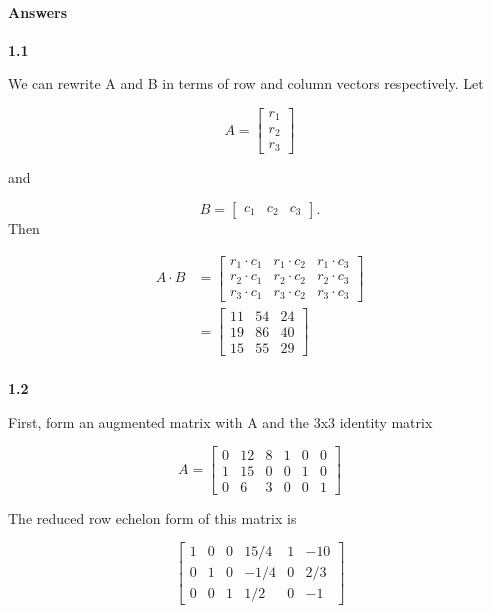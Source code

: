 \documentclass[11pt]{article}
\begin{document}
    \paragraph{Answers}\label{answers}

    \textbf{1.1}

    We can rewrite A and B in terms of row and column vectors respectively.
Let

\[
A = \begin{bmatrix} 
    r_1 \\
    r_2 \\
    r_3
\end{bmatrix}
\]

and

\[
B = \begin{bmatrix} 
    c_1 & c_2 & c_3
\end{bmatrix}.
\] Then

\[
\begin{split}
    A \cdot B & = \begin{bmatrix} 
        r_1 \cdot c_1 & r_1 \cdot c_2 & r_1 \cdot c_3 \\
        r_2 \cdot c_1 & r_2 \cdot c_2 & r_2 \cdot c_3 \\
        r_3 \cdot c_1 & r_3 \cdot c_2 & r_3 \cdot c_3
    \end{bmatrix} \\
     & = \begin{bmatrix} 
        11 & 54 & 24 \\
        19 & 86 & 40 \\
        15 & 55 & 29
    \end{bmatrix} \\
\end{split}
\]

    \textbf{1.2}

    First, form an augmented matrix with A and the 3x3 identity matrix

\[
A =
\left[
\begin{array}{ccc|ccc}
0 & 12 & 8 & 1 & 0 & 0 \\
1 & 15 & 0 & 0 & 1 & 0 \\
0 & 6  & 3 & 0 & 0 & 1 
\end{array}
\right]
\]

The reduced row echelon form of this matrix is

\[
\left[
\begin{array}{ccc|ccc}
1 & 0 & 0 & 15/4 & 1 & -10 \\
0 & 1 & 0 & -1/4 & 0 & 2/3 \\
0 & 0 & 1 & 1/2  & 0 & -1
\end{array}
\right]
\]
\end{document}
